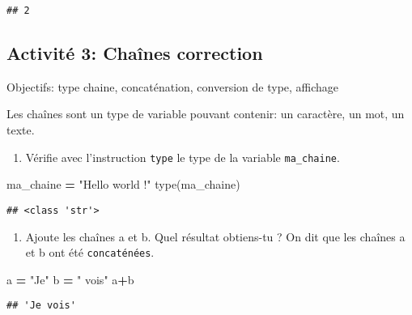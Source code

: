 \documentclass[
]{book}
\newenvironment{Shaded}{\begin{snugshade}}{\end{snugshade}}
\newcommand{\BuiltInTok}[1]{#1}
\newcommand{\NormalTok}[1]{#1}
\newcommand{\OperatorTok}[1]{\textcolor[rgb]{0.81,0.36,0.00}{\textbf{#1}}}
\newcommand{\StringTok}[1]{\textcolor[rgb]{0.31,0.60,0.02}{#1}}
\providecommand{\tightlist}{%
  \setlength{\itemsep}{0pt}\setlength{\parskip}{0pt}}
\def\tightlist{}
\begin{document}
\begin{verbatim}
## 2
\end{verbatim}

\newpage

\hypertarget{activituxe9-3-chauxeenes-correction}{%
\subsection{Activité 3: Chaînes correction}\label{activituxe9-3-chauxeenes-correction}}

Objectifs: type chaine, concaténation, conversion de type, affichage

Les chaînes sont un type de variable pouvant contenir: un caractère, un mot, un texte.

\begin{enumerate}
\def\labelenumi{\arabic{enumi}.}
\tightlist
\item
  Vérifie avec l'instruction \texttt{type} le type de la variable \texttt{ma\_chaine}.
\end{enumerate}

\begin{Shaded}
\begin{Highlighting}[]
\NormalTok{ma\_chaine }\OperatorTok{=} \StringTok{"Hello world !"}
\BuiltInTok{type}\NormalTok{(ma\_chaine)}
\end{Highlighting}
\end{Shaded}

\begin{verbatim}
## <class 'str'>
\end{verbatim}

\begin{enumerate}
\def\labelenumi{\arabic{enumi}.}
\setcounter{enumi}{1}
\tightlist
\item
  Ajoute les chaînes a et b. Quel résultat obtiens-tu ? On dit que les chaînes a et b ont été \texttt{concaténées}.
\end{enumerate}

\begin{Shaded}
\begin{Highlighting}[]
\NormalTok{a }\OperatorTok{=} \StringTok{"Je"}
\NormalTok{b }\OperatorTok{=} \StringTok{" vois"}
\NormalTok{a}\OperatorTok{+}\NormalTok{b}
\end{Highlighting}
\end{Shaded}

\begin{verbatim}
## 'Je vois'
\end{verbatim}
\end{document}
